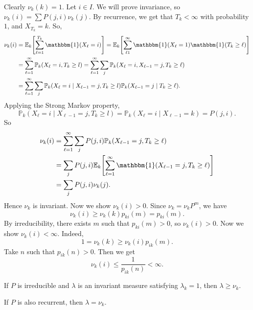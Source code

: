 \documentclass[12pt]{article}
\begin{document}
\begin{proofbox}
	Clearly $\nu_k(k) = 1$. Let $i \in I$. We will prove invariance, so $\nu_k(i) = \sum P(j,i) \nu_k(j)$. By recurrence, we get that $T_k < \infty$ with probability $1$, and $X_{T_k} = k$. So,
	\begin{align*}
		\nu_k(i) &= \mathbb{E}_k\Biggl[\sum_{\ell = 1}^{T_k}\mathbbm{1}(X_{\ell} = i)\Biggr] = \mathbb{E}_k\Biggl[\sum_{\ell  1}^{\infty} \mathbbm{1}(X_{\ell} = 1) \mathbbm{1}(T_k \geq \ell) \Biggr] \\
			 &= \sum_{\ell = 1}^{\infty} \mathbb{P}_k(X_{\ell} = i, T_k \geq l) = \sum_{\ell = 1}^{\infty} \sum_{j} \mathbb{P}_k(X_{\ell} = i, X_{\ell - 1} = j, T_{k} \geq \ell) \\
			 &= \sum_{\ell = 1}^{\infty} \sum_{j} \mathbb{P}_k(X_{\ell} = i \mid X_{\ell - 1} = j, T_{k} \geq l)\mathbb{P}_k(X_{\ell - 1}=j \mid T_{k} \geq \ell).
	\end{align*}
	Applying the Strong Markov property,
	\[
		\mathbb{P}_k(X_{\ell} = i \mid X_{\ell - 1} = j, T_k \geq l) = \mathbb{P}_k(X_{\ell} = i \mid X_{\ell - 1} = k) = P(j,i)
	.\]
	So
	\begin{align*}
		\nu_k(i) &= \sum_{\ell = 1}^{\infty} \sum_{j} P(j, i)\mathbb{P}_k(X_{\ell - 1} = j, T_{k} \geq \ell) \\
			 &= \sum_{j} P(j, i) \mathbb{E}_k\Biggl[\sum_{\ell = 1}^{\infty} \mathbbm{1}(X_{\ell - 1} = j, T_k \geq \ell) \Biggr] \\
			 &= \sum_{j} P(j, i) \nu_k(j).
	\end{align*}
	Hence $\nu_k$ is invariant. Now we show $\nu_k(i) > 0$. Since $\nu_k = \nu_k P^{m}$, we have
	\[
		\nu_k(i) \geq \nu_k(k) p_{ki}(m) = p_{ki}(m)
	.\]
	By irreducibility, there exists $m$ such that $p_{ki}(m) > 0$, so $\nu_k(i) > 0$. Now we show $\nu_k(i) < \infty$. Indeed,
	\[
		1 = \nu_k(k) \geq \nu_k(i) p_{ik}(m)
	.\]
	Take $n$ such that $p_{ik}(n) > 0$. Then we get
	\[
		\nu_k(i) \leq \frac{1}{p_{ik}(n)} < \infty
	.\]
\end{proofbox}

\begin{theorem}
	If $P$ is irreducible and $\lambda$ is an invariant measure satisfying $\lambda_k = 1$, then $\lambda \geq \nu_k$.
	
	If $P$ is also recurrent, then $\lambda = \nu_k$.
\end{theorem}
\end{document}
